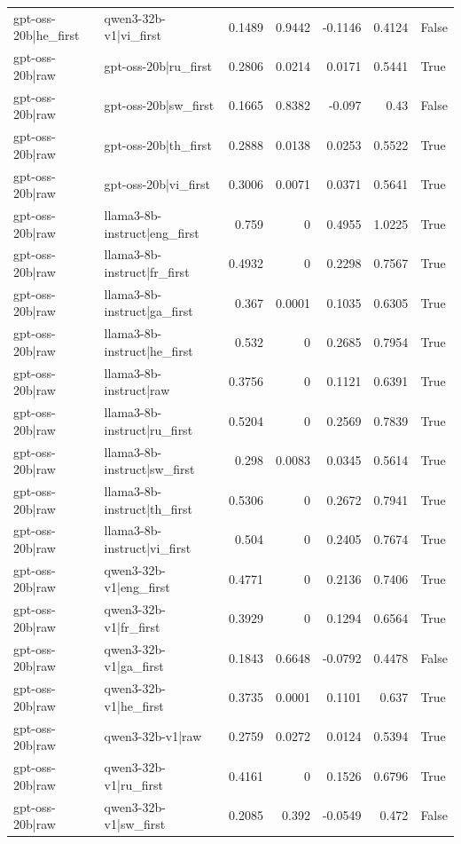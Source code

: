 \begin{table}
\begin{tabular}{l l r r r r l}
gpt-oss-20b|he_first & qwen3-32b-v1|vi_first & 0.1489 & 0.9442 & -0.1146 & 0.4124 & False \\
gpt-oss-20b|raw & gpt-oss-20b|ru_first & 0.2806 & 0.0214 & 0.0171 & 0.5441 & True \\
gpt-oss-20b|raw & gpt-oss-20b|sw_first & 0.1665 & 0.8382 & -0.097 & 0.43 & False \\
gpt-oss-20b|raw & gpt-oss-20b|th_first & 0.2888 & 0.0138 & 0.0253 & 0.5522 & True \\
gpt-oss-20b|raw & gpt-oss-20b|vi_first & 0.3006 & 0.0071 & 0.0371 & 0.5641 & True \\
gpt-oss-20b|raw & llama3-8b-instruct|eng_first & 0.759 & 0 & 0.4955 & 1.0225 & True \\
gpt-oss-20b|raw & llama3-8b-instruct|fr_first & 0.4932 & 0 & 0.2298 & 0.7567 & True \\
gpt-oss-20b|raw & llama3-8b-instruct|ga_first & 0.367 & 0.0001 & 0.1035 & 0.6305 & True \\
gpt-oss-20b|raw & llama3-8b-instruct|he_first & 0.532 & 0 & 0.2685 & 0.7954 & True \\
gpt-oss-20b|raw & llama3-8b-instruct|raw & 0.3756 & 0 & 0.1121 & 0.6391 & True \\
gpt-oss-20b|raw & llama3-8b-instruct|ru_first & 0.5204 & 0 & 0.2569 & 0.7839 & True \\
gpt-oss-20b|raw & llama3-8b-instruct|sw_first & 0.298 & 0.0083 & 0.0345 & 0.5614 & True \\
gpt-oss-20b|raw & llama3-8b-instruct|th_first & 0.5306 & 0 & 0.2672 & 0.7941 & True \\
gpt-oss-20b|raw & llama3-8b-instruct|vi_first & 0.504 & 0 & 0.2405 & 0.7674 & True \\
gpt-oss-20b|raw & qwen3-32b-v1|eng_first & 0.4771 & 0 & 0.2136 & 0.7406 & True \\
gpt-oss-20b|raw & qwen3-32b-v1|fr_first & 0.3929 & 0 & 0.1294 & 0.6564 & True \\
gpt-oss-20b|raw & qwen3-32b-v1|ga_first & 0.1843 & 0.6648 & -0.0792 & 0.4478 & False \\
gpt-oss-20b|raw & qwen3-32b-v1|he_first & 0.3735 & 0.0001 & 0.1101 & 0.637 & True \\
gpt-oss-20b|raw & qwen3-32b-v1|raw & 0.2759 & 0.0272 & 0.0124 & 0.5394 & True \\
gpt-oss-20b|raw & qwen3-32b-v1|ru_first & 0.4161 & 0 & 0.1526 & 0.6796 & True \\
gpt-oss-20b|raw & qwen3-32b-v1|sw_first & 0.2085 & 0.392 & -0.0549 & 0.472 & False \\

\end{tabular}
\end{table}
